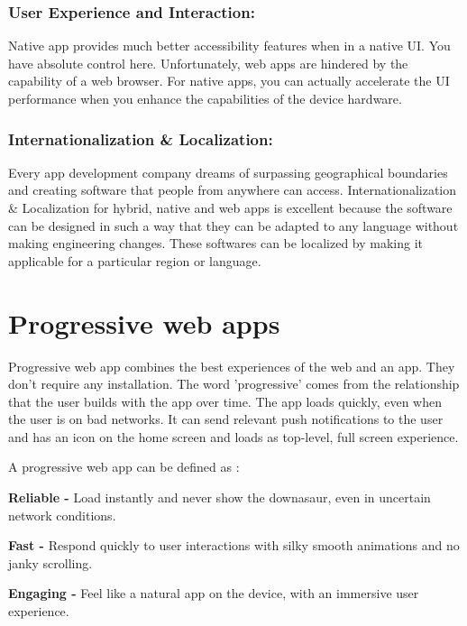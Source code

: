 \documentclass[14pt,a4paper,final]{extreport}
\begin{document}
\subsection{User Experience and Interaction:}
Native app provides much better accessibility features when in a native UI. You have absolute control here. Unfortunately, web apps are hindered by the capability of a web browser. For native apps, you can actually accelerate the UI performance when you enhance the capabilities of the device hardware.
\subsection{Internationalization & Localization:}
Every app development company dreams of surpassing geographical boundaries and creating software that people from anywhere can access. Internationalization & Localization for hybrid, native and web apps is excellent because the software can be designed in such a way that they can be adapted to any language without making engineering changes. These softwares can be localized by making it applicable for a particular region or language.

\chapter{Progressive web apps}


\item \textbfA Progressive web app combines the best experiences of the web and an app. They don't require any installation. The word 'progressive' comes from the relationship that the user builds with the app over time. The app loads quickly, even when the user is on bad networks. It can send relevant push notifications to the user and has an icon on the home screen and loads as top-level, full screen experience.

\item A progressive web app can be defined as :

\item\textbf{Reliable -} Load instantly and never show the downasaur, even in uncertain network conditions.

\item \textbf{Fast -} Respond quickly to user interactions with silky smooth animations and no janky scrolling.
\item \textbf{Engaging -} Feel like a natural app on the device, with an immersive user experience.
\end{document}
